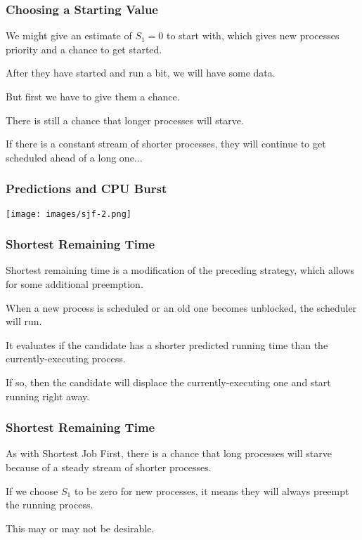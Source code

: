 \begin{frame}
\frametitle{Choosing a Starting Value}


We might give an estimate of $S_{1} = 0$ to start with, which gives new processes priority and a chance to get started. 

After they have started and run a bit, we will have some data. 

But first we have to give them a chance.

There is still a chance that longer processes will starve. 

If there is a constant stream of shorter processes, they will continue to get scheduled ahead of a long one...

\end{frame}

\begin{frame}
\frametitle{Predictions and CPU Burst}

\begin{center}
\texttt{[image: images/sjf-2.png]}
\end{center}


\end{frame}

\begin{frame}
\frametitle{Shortest Remaining Time}

Shortest remaining time is a modification of the preceding strategy, which allows for some additional preemption. 

When a new process is scheduled or an old one becomes unblocked, the scheduler will run.

It evaluates if the candidate has a shorter predicted running time than the currently-executing process. 

If so, then the candidate will displace the currently-executing one and start running right away.


\end{frame}

\begin{frame}
\frametitle{Shortest Remaining Time}

As with Shortest Job First, there is a chance that long processes will starve because of a steady stream of shorter processes. 

If we choose $S_{1}$ to be zero for new processes, it means they will always preempt the running process. 

This may or may not be desirable.


\end{frame}

